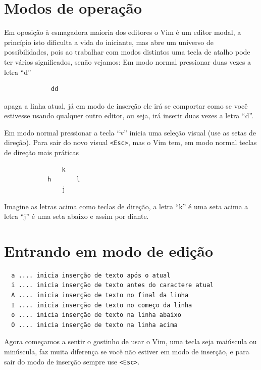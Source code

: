 \documentclass[10pt,a4paper,openany]{book}
\begin{document}
\section{Modos de operação}\label{Modos de operação}

Em oposição à esmagadora maioria dos editores o Vim é um editor modal, a
princípio isto dificulta a vida do iniciante, mas abre um universo de
possibilidades, pois ao trabalhar com modos distintos uma tecla de
atalho pode ter vários significados, senão vejamos:
Em modo normal pressionar duas vezes a letra ``d''
\begin{verbatim}
			 dd
\end{verbatim}
apaga a linha atual, já em modo de inserção ele irá se comportar como se você estivesse
usando qualquer outro editor, ou seja, irá inserir duas vezes a letra ``d''.

Em modo normal pressionar a tecla ``v'' inicia uma seleção visual (use as setas de direção).
Para sair do novo visual \verb|<Esc>|, mas o Vim tem, em modo normal teclas de direção mais práticas

\begin{verbatim}
				k
			h		l
				j
\end{verbatim}

Imagine as letras acima como teclas de direção, a letra ``k'' é uma seta acima
a letra ``j'' é uma seta abaixo e assim por diante.



\section{Entrando em modo de edição}
\label{Entrando em modo de edição}

\begin{verbatim}
  a .... inicia inserção de texto após o atual
  i .... inicia inserção de texto antes do caractere atual
  A .... inicia inserção de texto no final da linha
  I .... inicia inserção de texto no começo da linha
  o .... inicia inserção de texto na linha abaixo
  O .... inicia inserção de texto na linha acima
\end{verbatim}

Agora começamos a sentir o gostinho de usar o Vim, uma tecla seja
maiúscula ou minúscula, faz muita diferença se você não estiver em
modo de inserção, e para sair do modo de inserção sempre use \verb|<Esc>|.
\end{document}
